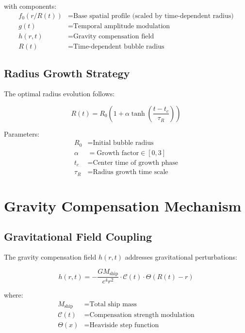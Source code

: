 \documentclass[12pt,a4paper]{article}
\begin{document}
with components:
\begin{align}
f_0(r/R(t)) &= \text{Base spatial profile (scaled by time-dependent radius)} \\
g(t) &= \text{Temporal amplitude modulation} \\
h(r,t) &= \text{Gravity compensation field} \\
R(t) &= \text{Time-dependent bubble radius}
\end{align}

\subsection{Radius Growth Strategy}

The optimal radius evolution follows:

\begin{equation}
R(t) = R_0 \left(1 + \alpha \tanh\left(\frac{t - t_c}{\tau_R}\right)\right)
\end{equation}

Parameters:
\begin{align}
R_0 &= \text{Initial bubble radius} \\
\alpha &= \text{Growth factor} \in [0, 3] \\
t_c &= \text{Center time of growth phase} \\
\tau_R &= \text{Radius growth time scale}
\end{align}

\section{Gravity Compensation Mechanism}

\subsection{Gravitational Field Coupling}

The gravity compensation field $h(r,t)$ addresses gravitational perturbations:

\begin{equation}
h(r,t) = -\frac{G M_{\text{ship}}}{c^4 r^2} \cdot \mathcal{C}(t) \cdot \Theta(R(t) - r)
\end{equation}

where:
\begin{align}
M_{\text{ship}} &= \text{Total ship mass} \\
\mathcal{C}(t) &= \text{Compensation strength modulation} \\
\Theta(x) &= \text{Heaviside step function}
\end{align}
\end{document}
